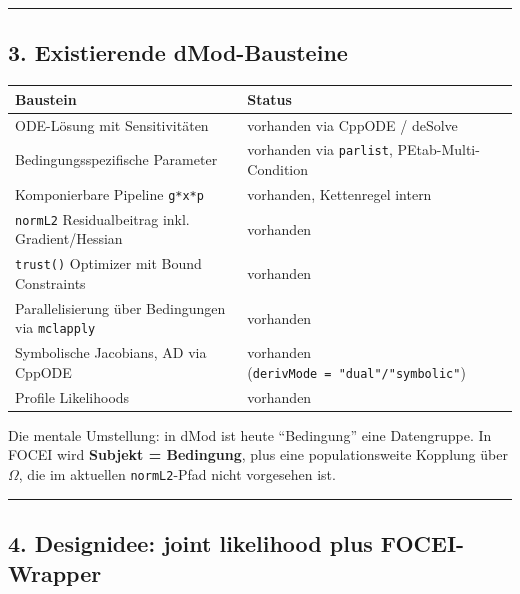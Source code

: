 \documentclass[
]{article}
\newcounter{none} %
\begin{document}
\begin{center}\rule{0.5\linewidth}{0.5pt}\end{center}

\subsection{3. Existierende
dMod-Bausteine}\label{existierende-dmod-bausteine}

{\def\LTcaptype{none} %
\begin{longtable}[]{@{}
  >{\raggedright\arraybackslash}p{}
  >{\raggedright\arraybackslash}p{}@{}}
\toprule\noalign{}
\begin{minipage}[b]{\linewidth}\raggedright
Baustein
\end{minipage} & \begin{minipage}[b]{\linewidth}\raggedright
Status
\end{minipage} \\
\midrule\noalign{}
\endhead
\bottomrule\noalign{}
\endlastfoot
ODE-Lösung mit Sensitivitäten & vorhanden via CppODE / deSolve \\
Bedingungsspezifische Parameter & vorhanden via \texttt{parlist},
PEtab-Multi-Condition \\
Komponierbare Pipeline \texttt{g*x*p} & vorhanden, Kettenregel intern \\
\texttt{normL2} Residualbeitrag inkl. Gradient/Hessian & vorhanden \\
\texttt{trust()} Optimizer mit Bound Constraints & vorhanden \\
Parallelisierung über Bedingungen via \texttt{mclapply} & vorhanden \\
Symbolische Jacobians, AD via CppODE & vorhanden
(\texttt{derivMode\ =\ "dual"/"symbolic"}) \\
Profile Likelihoods & vorhanden \\
\end{longtable}
}

Die mentale Umstellung: in dMod ist heute ``Bedingung'' eine
Datengruppe. In FOCEI wird \textbf{Subjekt = Bedingung}, plus eine
populationsweite Kopplung über \(\Omega\), die im aktuellen
\texttt{normL2}-Pfad nicht vorgesehen ist.

\begin{center}\rule{0.5\linewidth}{0.5pt}\end{center}

\subsection{4. Designidee: joint likelihood plus
FOCEI-Wrapper}\label{designidee-joint-likelihood-plus-focei-wrapper}
\end{document}
